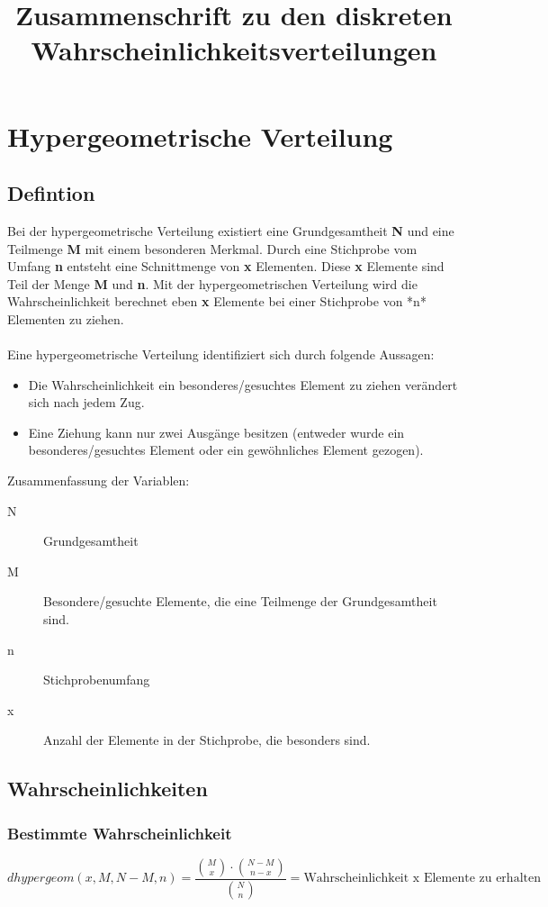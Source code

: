 \documentclass[a4paper,10pt]{article}
\title{Zusammenschrift zu den diskreten Wahrscheinlichkeitsverteilungen}
\begin{document}
\maketitle
\thispagestyle{fancy}

\section{Hypergeometrische Verteilung}
\subsection{Defintion}
Bei der hypergeometrische Verteilung existiert eine Grundgesamtheit
\textbf{N} und eine Teilmenge \textbf{M} mit einem besonderen Merkmal. Durch eine
Stichprobe vom Umfang \textbf{n} entsteht eine Schnittmenge von \textbf{x}
Elementen. Diese \textbf{x} Elemente sind Teil der Menge \textbf{M} und \textbf{n}. Mit der
hypergeometrischen Verteilung wird die Wahrscheinlichkeit berechnet
eben \textbf{x} Elemente bei einer Stichprobe von *n* Elementen zu ziehen.
\\\\
Eine hypergeometrische Verteilung identifiziert sich durch folgende
Aussagen:
\begin{itemize}
\item Die Wahrscheinlichkeit ein besonderes/gesuchtes Element zu
  ziehen verändert sich nach jedem Zug.
\item Eine Ziehung kann nur zwei Ausgänge besitzen (entweder wurde ein
  besonderes/gesuchtes Element oder ein gewöhnliches Element gezogen).
\end{itemize}

Zusammenfassung der Variablen:
\begin{description}
\item[N] Grundgesamtheit
\item[M] Besondere/gesuchte Elemente, die eine Teilmenge der
  Grundgesamtheit sind.
\item[n] Stichprobenumfang
\item[x] Anzahl der Elemente in der Stichprobe, die besonders sind.
\end{description}

\subsection{Wahrscheinlichkeiten}
\subsubsection{Bestimmte Wahrscheinlichkeit}
\begin{equation}
  \label{eq:1}
  dhypergeom(x, M, N - M, n) = \frac{\binom{M}{x} \cdot \binom{N - M}{n - x}}{\binom{N}{n}} = \text{Wahrscheinlichkeit x Elemente zu erhalten}
\end{equation}
\end{document}
